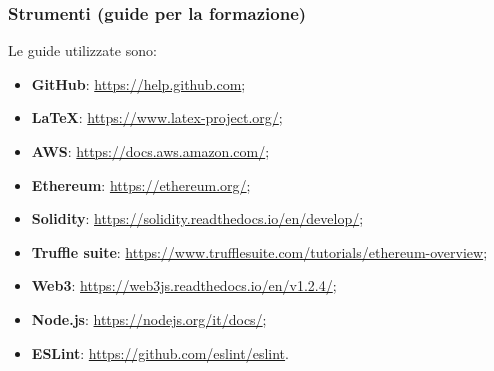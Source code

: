 	\subsubsection{Strumenti (guide per la formazione)}
	Le guide utilizzate sono:
	\begin{itemize}
		\item \textbf{GitHub\glos}: \href{https://help.github.com}{https://help.github.com};
		\item \textbf{\LaTeX}: \href{https://www.latex-project.org/}{https://www.latex-project.org/};
		\item \textbf{AWS}: \href{https://docs.aws.amazon.com/}{https://docs.aws.amazon.com/};
		\item \textbf{Ethereum\glos}: \href{https://ethereum.org/}{https://ethereum.org/};
		\item \textbf{Solidity}: \href{https://solidity.readthedocs.io/en/develop/}{https://solidity.readthedocs.io/en/develop/};
		\item \textbf{Truffle suite}: \href{https://www.trufflesuite.com/tutorials/ethereum-overview}{https://www.trufflesuite.com/tutorials/ethereum-overview};
		\item \textbf{Web3}: \href{https://web3js.readthedocs.io/en/v1.2.4/}{https://web3js.readthedocs.io/en/v1.2.4/};
		\item \textbf{Node.js}: \href{https://nodejs.org/it/docs/}{https://nodejs.org/it/docs/};
		\item \textbf{ESLint}: \href{https://github.com/eslint/eslint}{https://github.com/eslint/eslint}.
\end{itemize}

